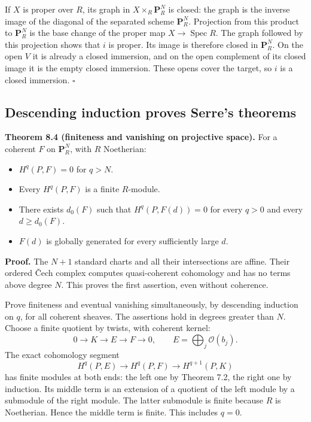 \documentclass[11pt,a4paper,openany]{report}
\providecommand{\tightlist}{\setlength{\itemsep}{0pt}\setlength{\parskip}{0pt}}
\begin{document}
If \(X\) is proper over \(R\), its graph in \(X\times_R\mathbf P_R^N\) is closed: the graph is the inverse image of the diagonal of the separated scheme \(\mathbf P_R^N\). Projection from this product to \(\mathbf P_R^N\) is the base change of the proper map \(X\to\operatorname{Spec}R\). The graph followed by this projection shows that \(i\) is proper. Its image is therefore closed in \(\mathbf P_R^N\). On the open \(V\) it is already a closed immersion, and on the open complement of its closed image it is the empty closed immersion. These opens cover the target, so \(i\) is a closed immersion. \(\square\)

\subsection{Descending induction proves Serre's theorems}\label{AG-RG-S01-descending-induction-proves-serres-theorems}

\textbf{Theorem 8.4 (finiteness and vanishing on projective space).} For a coherent \(F\) on \(\mathbf P_R^N\), with \(R\) Noetherian:

\begin{itemize}
\tightlist
\item
  \(H^q(P,F)=0\) for \(q>N\).
\item
  Every \(H^q(P,F)\) is a finite \(R\)-module.
\item
  There exists \(d_0(F)\) such that \(H^q(P,F(d))=0\) for every \(q>0\) and every \(d\ge d_0(F)\).
\item
  \(F(d)\) is globally generated for every sufficiently large \(d\).
\end{itemize}

\textbf{Proof.} The \(N+1\) standard charts and all their intersections are affine. Their ordered Čech complex computes quasi-coherent cohomology and has no terms above degree \(N\). This proves the first assertion, even without coherence.

Prove finiteness and eventual vanishing simultaneously, by descending induction on \(q\), for all coherent sheaves. The assertions hold in degrees greater than \(N\). Choose a finite quotient by twists, with coherent kernel: \[
0\longrightarrow K\longrightarrow E\longrightarrow F\longrightarrow0,
\qquad E=\bigoplus_j\mathcal O(b_j).
\] The exact cohomology segment \[
H^q(P,E)\longrightarrow H^q(P,F)\longrightarrow H^{q+1}(P,K)
\] has finite modules at both ends: the left one by Theorem 7.2, the right one by induction. Its middle term is an extension of a quotient of the left module by a submodule of the right module. The latter submodule is finite because \(R\) is Noetherian. Hence the middle term is finite. This includes \(q=0\).
\end{document}
